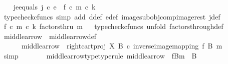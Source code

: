 \begin{isabellebody}
\ \ \isamarkupfalse%
\ je{\isacharunderscore}{\kern0pt}equals{\isacharcolon}{\kern0pt}\ {\isachardoublequoteopen}j\ {\isasymcirc}\isactrlsub c\ e\ {\isacharequal}{\kern0pt}\ f\ {\isasymcirc}\isactrlsub c\ m{\isacharprime}{\kern0pt}\ {\isasymcirc}\isactrlsub c\ k{\isachardoublequoteclose}\isanewline
\ \ \ \ \isamarkupfalse%
\ {\isacharparenleft}{\kern0pt}typecheck{\isacharunderscore}{\kern0pt}cfuncs{\isacharcomma}{\kern0pt}\ simp\ add{\isacharcolon}{\kern0pt}\ d{\isacharunderscore}{\kern0pt}def\ e{\isacharunderscore}{\kern0pt}def\ image{\isacharunderscore}{\kern0pt}subobj{\isacharunderscore}{\kern0pt}comp{\isacharunderscore}{\kern0pt}image{\isacharunderscore}{\kern0pt}rest\ j{\isacharunderscore}{\kern0pt}def{\isacharparenright}{\kern0pt}\isanewline
\isanewline
\ \ \isamarkupfalse%
\ {\isachardoublequoteopen}{\isacharparenleft}{\kern0pt}f\ {\isasymcirc}\isactrlsub c\ m{\isacharprime}{\kern0pt}\ {\isasymcirc}\isactrlsub c\ k{\isacharparenright}{\kern0pt}\ factorsthru\ m{\isachardoublequoteclose}\isanewline
\ \ \isamarkupfalse%
{\isacharparenleft}{\kern0pt}typecheck{\isacharunderscore}{\kern0pt}cfuncs{\isacharcomma}{\kern0pt}\ unfold\ factors{\isacharunderscore}{\kern0pt}through{\isacharunderscore}{\kern0pt}def{}{\isacharparenright}{\kern0pt}\ \isanewline
\isanewline
\ \ \ \ \isamarkupfalse%
\ middle{\isacharunderscore}{\kern0pt}arrow\ \ middle{\isacharunderscore}{\kern0pt}arrow{\isacharunderscore}{\kern0pt}def{\isacharcolon}{\kern0pt}\ \isanewline
\ \ \ \ \ \ {\isachardoublequoteopen}middle{\isacharunderscore}{\kern0pt}arrow\ {\isacharequal}{\kern0pt}\ {\isacharparenleft}{\kern0pt}right{\isacharunderscore}{\kern0pt}cart{\isacharunderscore}{\kern0pt}proj\ X\ B{\isacharparenright}{\kern0pt}\ {\isasymcirc}\isactrlsub c\ {\isacharparenleft}{\kern0pt}inverse{\isacharunderscore}{\kern0pt}image{\isacharunderscore}{\kern0pt}mapping\ f\ B\ m{\isacharparenright}{\kern0pt}{\isachardoublequoteclose}\isanewline
\ \ \ \ \ \ \isamarkupfalse%
\ simp\isanewline
\isanewline
\ \ \ \ \isamarkupfalse%
\ \isamarkupfalse%
\ middle{\isacharunderscore}{\kern0pt}arrow{\isacharunderscore}{\kern0pt}type{\isacharbrackleft}{\kern0pt}type{\isacharunderscore}{\kern0pt}rule{\isacharbrackright}{\kern0pt}{\isacharcolon}{\kern0pt}\ {\isachardoublequoteopen}middle{\isacharunderscore}{\kern0pt}arrow\ {\isacharcolon}{\kern0pt}\ f\isactrlsup {\isacharminus}{\kern0pt}B{\isasymrparr}\isactrlbsub m\isactrlesub \ {\isasymrightarrow}\ B{\isachardoublequoteclose}\isanewline

\end{isabellebody}
